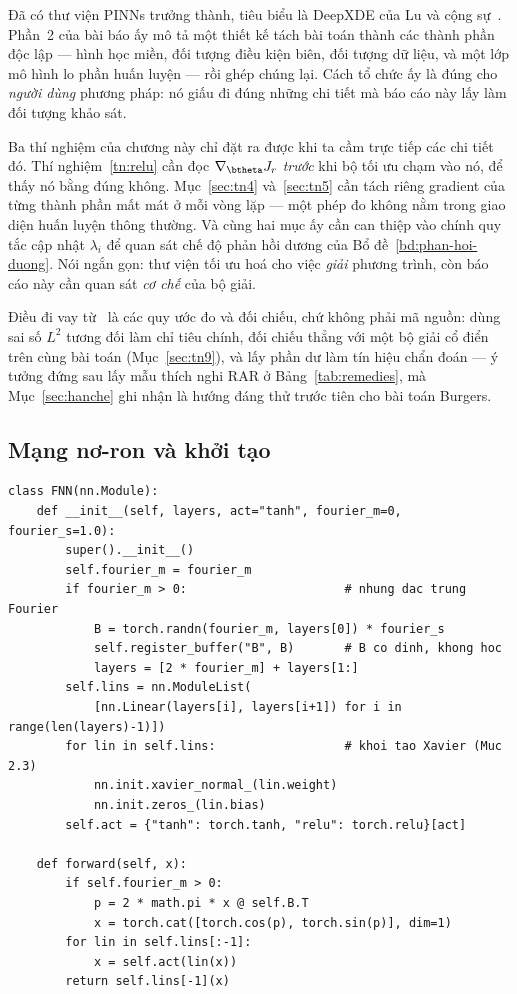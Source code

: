 \begin{nhanxet}
\label{nx:vi-sao-tu-viet}
Đã có thư viện PINNs trưởng thành, tiêu biểu là DeepXDE của Lu và cộng
sự~\cite{lu2021}. Phần~2 của bài báo ấy mô tả một thiết kế tách bài toán thành
các thành phần độc lập --- hình học miền, đối tượng điều kiện biên, đối tượng dữ
liệu, và một lớp mô hình lo phần huấn luyện --- rồi ghép chúng lại. Cách tổ chức ấy là đúng cho \emph{người dùng}
phương pháp: nó giấu đi đúng những chi tiết mà báo cáo này lấy làm đối tượng
khảo sát.

Ba thí nghiệm của chương này chỉ đặt ra được khi ta cầm trực tiếp các chi tiết
đó. Thí nghiệm~\ref{tn:relu} cần đọc $\nabla_{\btheta}J_r$ \emph{trước} khi bộ
tối ưu chạm vào nó, để thấy nó bằng đúng không. Mục~\ref{sec:tn4} và~\ref{sec:tn5} cần tách
riêng gradient của từng thành phần mất mát ở mỗi vòng lặp --- một phép đo không
nằm trong giao diện huấn luyện thông thường. Và cùng hai mục ấy cần
can thiệp vào chính quy tắc cập nhật $\lambda_i$ để quan sát chế độ phản hồi
dương của Bổ đề~\ref{bd:phan-hoi-duong}. Nói ngắn gọn: thư viện tối ưu hoá cho
việc \emph{giải} phương trình, còn báo cáo này cần quan sát \emph{cơ chế} của
bộ giải.

Điều đi vay từ~\cite{lu2021} là các quy ước đo và đối chiếu, chứ không phải mã
nguồn: dùng sai số $L^2$ tương đối làm chỉ tiêu chính, đối chiếu thẳng với một
bộ giải cổ điển trên cùng bài toán (Mục~\ref{sec:tn9}), và lấy phần dư làm tín
hiệu chẩn đoán --- ý tưởng đứng sau lấy mẫu thích nghi RAR ở
Bảng~\ref{tab:remedies}, mà Mục~\ref{sec:hanche} ghi nhận là hướng đáng thử
trước tiên cho bài toán Burgers.
\end{nhanxet}
 
\subsection{Mạng nơ-ron và khởi tạo}
 
\begin{lstlisting}[caption={Mạng truyền thẳng với khởi tạo Xavier và nhúng đặc trưng Fourier tuỳ chọn.},label={lst:fnn}]
class FNN(nn.Module):
    def __init__(self, layers, act="tanh", fourier_m=0, fourier_s=1.0):
        super().__init__()
        self.fourier_m = fourier_m
        if fourier_m > 0:                      # nhung dac trung Fourier
            B = torch.randn(fourier_m, layers[0]) * fourier_s
            self.register_buffer("B", B)       # B co dinh, khong hoc
            layers = [2 * fourier_m] + layers[1:]
        self.lins = nn.ModuleList(
            [nn.Linear(layers[i], layers[i+1]) for i in range(len(layers)-1)])
        for lin in self.lins:                  # khoi tao Xavier (Muc 2.3)
            nn.init.xavier_normal_(lin.weight)
            nn.init.zeros_(lin.bias)
        self.act = {"tanh": torch.tanh, "relu": torch.relu}[act]
 
    def forward(self, x):
        if self.fourier_m > 0:
            p = 2 * math.pi * x @ self.B.T
            x = torch.cat([torch.cos(p), torch.sin(p)], dim=1)
        for lin in self.lins[:-1]:
            x = self.act(lin(x))
        return self.lins[-1](x)
\end{lstlisting}
 
